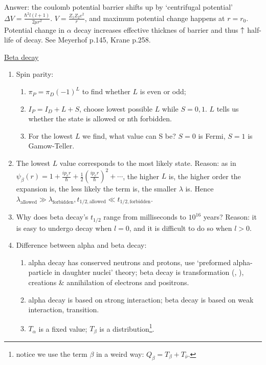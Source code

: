 \documentclass{school-22.101-notes}
\begin{document}
\begin{enumerate}
Answer: the coulomb potential barrier shifts up by `centrifugal potential' $\Delta V = \frac{\hbar^2 l(l+1)}{2\mu r^2}$.  $V = \frac{Z_1 Z_2 e^2}{r}$, and maximum potential change happens at $r = r_0$. Potential change in $\alpha$ decay increases effective thicknes of barrier and thus $\uparrow$ half-life of decay. See Meyerhof p.145, Krane p.258. 
\end{enumerate}




\clearpage
\uline{Beta decay}
\begin{enumerate}
\item Spin parity: 
    \begin{enumerate}
    \item $\pi_P = \pi_D (-1)^L$ to find whether $L$ is even or odd;
    \item $I_P = I_D + L + S$, choose lowest possible $L$ while $S = 0,1$. $L$ tells us whether the state is allowed or nth forbidden.
    \item For the lowest $L$ we find, what value can S be? $S=0$ is Fermi, $S=1$ is Gamow-Teller. 
    \end{enumerate}
\item The lowest $L$ value corresponds to the most likely state. Reason: as in $\psi_{\beta} (r) = 1 + \frac{i p_e r}{\hbar} + \frac{1}{2} \left( \frac{i p_e r}{\hbar} \right)^2 + \cdots$, the higher $L$ is, the higher order the expansion is, the less likely the term is, the smaller $\lambda$ is. Hence $\lambda_{\mathrm{allowed}} \gg \lambda_{\mathrm{forbidden}}, t_{1/2,\mathrm{allowed}} \ll t_{1/2,\mathrm{forbidden}}$. 
\item Why does beta decay's $t_{1/2}$ range from milliseconds to $10^{16}$ years? Reason: it is easy to undergo decay when $l=0$, and it is difficult to do so when $l>0$.     
\item Difference between alpha and beta decay: 
    \begin{enumerate}
    \item alpha decay has conserved neutrons and protons, use `preformed alpha-particle in daughter nuclei' theory; beta decay is transformation (, ), creations \& annihilation of electrons and positrons.
    \item alpha decay is based on strong interaction; beta decay is based on weak interaction, transition. 
    \item $T_{\alpha}$ is a fixed value; $T_{\beta}$ is a distribution\footnote{notice we use the term $\beta$ in a weird way: $Q_{\beta} = T_{\beta} + T_{\bar{\nu}}$.}. 

\end{enumerate}
\end{enumerate}
\end{document}
